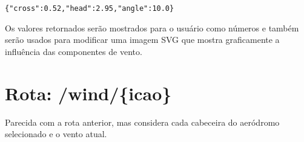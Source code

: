 \verb|{"cross":0.52,"head":2.95,"angle":10.0}|

Os valores retornados serão mostrados para o usuário como números e também serão
usados para modificar uma imagem SVG que mostra graficamente a influência das
componentes de vento.

\section{Rota: /wind/\{icao\}}
Parecida com a rota anterior, mas considera cada cabeceira do aeródromo selecionado
e o vento atual.



